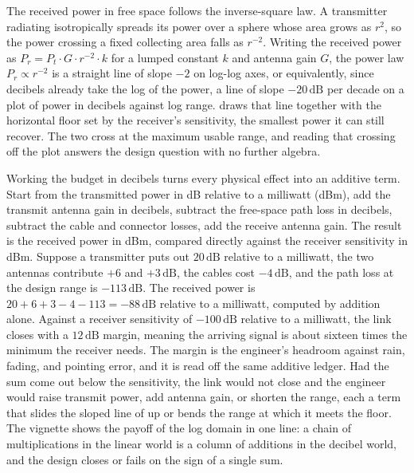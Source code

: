 The received power in free space follows the inverse-square law. A
transmitter radiating isotropically spreads its power over a sphere
whose area grows as $r^2$, so the power crossing a fixed collecting
area falls as $r^{-2}$. Writing the received power as
$P_r = P_t \cdot G \cdot r^{-2} \cdot k$ for a lumped constant $k$ and
antenna gain $G$, the power law $P_r \propto r^{-2}$ is a straight line
of slope $-2$ on log-log axes, or equivalently, since decibels already
take the log of the power, a line of slope $-20\,\si{\deci\bel}$ per
decade on a plot of power in decibels against log range.
 draws that line together with
the horizontal floor set by the receiver's sensitivity, the smallest
power it can still recover. The two cross at the maximum usable range,
and reading that crossing off the plot answers the design question with
no further algebra.

Working the budget in decibels turns every physical effect into an
additive term. Start from the transmitted power in \si{\deci\bel}
relative to a milliwatt (dBm), add the transmit antenna gain in
decibels, subtract the free-space path loss in decibels, subtract the
cable and connector losses, add the receive antenna gain. The result
is the received power in dBm, compared directly against the receiver
sensitivity in dBm. Suppose a transmitter puts out $20\,\si{\deci\bel}$
relative to a milliwatt, the two antennas contribute $+6$ and
$+3\,\si{\deci\bel}$, the cables cost $-4\,\si{\deci\bel}$, and the
path loss at the design range is $-113\,\si{\deci\bel}$. The received
power is $20 + 6 + 3 - 4 - 113 = -88\,\si{\deci\bel}$ relative to a
milliwatt, computed by addition alone. Against a receiver sensitivity
of $-100\,\si{\deci\bel}$ relative to a milliwatt, the link closes with
a $12\,\si{\deci\bel}$ margin, meaning the arriving signal is about
sixteen times the minimum the receiver needs. The margin is the
engineer's headroom against rain, fading, and pointing error, and it
is read off the same additive ledger. Had the sum come out below the
sensitivity, the link would not close and the engineer would raise
transmit power, add antenna gain, or shorten the range, each a term
that slides the sloped line of
 up or bends the range at which
it meets the floor. The vignette shows the payoff of the log domain in
one line: a chain of multiplications in the linear world is a column of
additions in the decibel world, and the design closes or fails on the
sign of a single sum.

